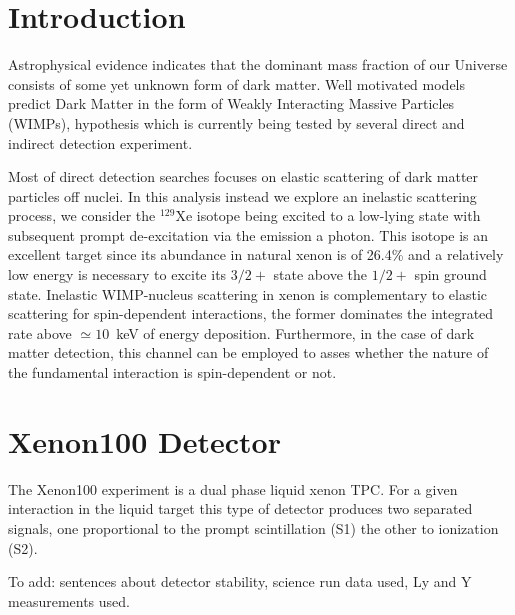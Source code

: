 \section{\label{sec:level1} Introduction}
Astrophysical evidence indicates that the dominant mass fraction of our Universe consists of some yet unknown form
of dark matter. Well motivated models predict Dark Matter in the form of Weakly Interacting Massive Particles (WIMPs),
hypothesis which is currently being tested by several direct and indirect detection experiment.

Most of direct detection searches focuses on  elastic scattering of dark matter particles off nuclei.
In this analysis instead we explore an inelastic scattering process, we consider the $^{129}\text{Xe}$ isotope being excited to a low-lying state
with subsequent prompt de-excitation via the emission a photon. This isotope is an excellent target
since its abundance in natural xenon is of 26.4\% and a relatively low energy is necessary to excite its $3/2+$ state above the $1/2+$
spin ground state.
Inelastic WIMP-nucleus scattering in xenon is complementary to elastic scattering for spin-dependent interactions,
the former dominates the integrated rate above  $\simeq10$~keV of energy deposition.
Furthermore, in the case of dark matter detection, this channel can be employed to asses whether the nature of the fundamental interaction
is spin-dependent or not.

\section{Xenon100 Detector}
The Xenon100 experiment is a  dual phase liquid xenon TPC. For a given interaction in the liquid target this type of detector produces two separated signals,
one proportional to the prompt scintillation (S1) the other to ionization (S2).

To add: sentences about detector stability, science run data used, Ly and Y measurements used. 

